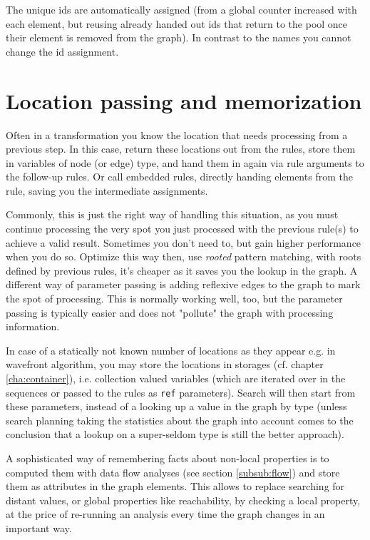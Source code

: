 The unique ids are automatically assigned (from a global counter increased with each element, but reusing already handed out ids that return to the pool once their element is removed from the graph). In contrast to the names you cannot change the id assignment.


\section{Location passing and memorization}
Often in a transformation you know the location that needs processing from a previous step.
In this case, return these locations out from the rules, store them in variables of node (or edge) type, and hand them in again via rule arguments to the follow-up rules.
Or call embedded rules, directly handing elements from the rule, saving you the intermediate assignments.

Commonly, this is just the right way of handling this situation, 
as you must continue processing the very spot you just processed with the previous rule(s) to achieve a valid result.
Sometimes you don't need to, but gain higher performance when you do so.
Optimize this way then, use \emph{rooted} pattern matching, with roots defined by previous rules, it's cheaper as it saves you the lookup in the graph.
A different way of parameter passing is adding reflexive edges to the graph to mark the spot of processing.
This is normally working well, too, but the parameter passing is typically easier and does not "pollute" the graph with processing information.

In case of a statically not known number of locations as they appear e.g. in wavefront algorithm, you may store the locations in storages (cf. chapter \ref{cha:container}), i.e. collection valued variables (which are iterated over in the sequences or passed to the rules as \texttt{ref} parameters).
Search will then start from these parameters, instead of a looking up a value in the graph by type (unless search planning taking the statistics about the graph into account comes to the conclusion that a lookup on a super-seldom type is still the better approach).

A sophisticated way of remembering facts about non-local properties is to computed them with data flow analyses (see section \ref{subsub:flow}) and store them as attributes in the graph elements.
This allows to replace searching for distant values, or global properties like reachability, by checking a local property, at the price of re-running an analysis every time the graph changes in an important way.

